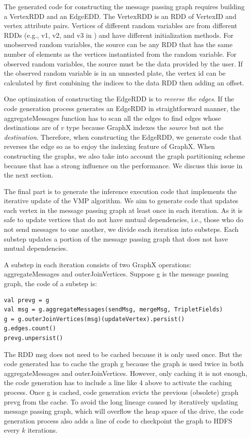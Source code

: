 The generated code for constructing  the message passing graph requires  building a VertexRDD
and an EdgeEDD. The VertexRDD is an RDD of VertexID and vertex attribute pairs.
Vertices of different random variables
are from different RDDs (e.g., {\sf v1}, {\sf v2}, and {\sf v3} in )
and have different initialization methods.
For unobserved random variables, the source can be any RDD that has the same
number of elements as the vertices instantiated from the random variable. For
observed random variables, the source must be the data provided by the user. If
the observed random variable is in an unnested plate, the vertex id can be
calculated by first combining the indices to the data RDD then adding an offset.

One optimization of constructing the EdgeRDD is to \emph{reverse the edges}.
If the code generation process generates an EdgeRDD in straightforward manner,
the {\sf aggregateMessages} function 
has to scan all the edges 
to find edges whose destinations are of $v$ type
because GraphX indexes the \emph{source} but not the \emph{destination}.
Therefore, when constructing the EdgeRDD, we generate code that reverses the edge
so as to enjoy the indexing feature of GraphX.
When constructing the graphs,
we also take into account the graph partitioning scheme 
because that has a strong influence on the performance.
We discuss this issue in the next section.


The final part is to generate the inference execution code that implements the
iterative update of the VMP algorithm. 
We aim to generate code that updates each vertex in the
message passing graph at least once in each iteration. 
As it is safe to update vertices that do not
have mutual dependencies, i.e., those who do not send messages to one another,
we divide each iteration into substeps.
Each substep updates a portion of the
message passing graph that does not have mutual dependencies. 

A substep in each iteration consists of two GraphX operations:
{\sf aggregateMessages} and {\sf outerJoinVertices}. Suppose {\sf g} is the message passing
graph, the code of a substep is:
\begin{lstlisting}
val prevg = g
val msg = g.aggregateMessages(sendMsg, mergeMsg, TripletFields)
g = g.outerJoinVertices(msg)(updateVertex).persist()
g.edges.count()
prevg.unpersist()
\end{lstlisting}

The RDD {\sf msg} does not need to be cached because it is only used once. But
the code generated has to cache the graph {\sf g} because the graph is used 
twice in both {\sf aggregateMessages} and {\sf outerJoinVertices}. However, only caching it is not
enough, the code generation has to include a line like 4 above to activate the caching process.
Once {\sf g} is cached, code generation evicts the previous (obsolete) graph {\sf prevg} from the cache.
To avoid the long lineage caused by iteratively updating message passing graph, which will overflow the heap space of the drive,
the code generation process also adds a line of code to checkpoint the graph to HDFS 
every $k$ iterations.

